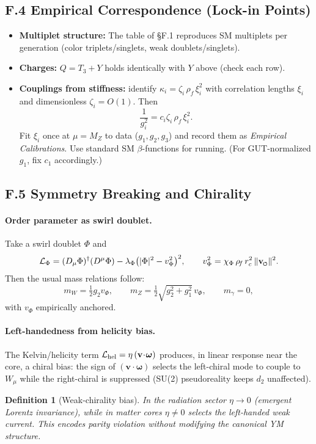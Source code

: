 \documentclass[11pt]{article}
\newcommand{\swirlarrow}{%
     \mathchoice{\mkern-2mu\scriptstyle\boldsymbol{\circlearrowleft}}%
                {\mkern-2mu\scriptstyle\boldsymbol{\circlearrowleft}}%
                {\mkern-2mu\scriptscriptstyle\boldsymbol{\circlearrowleft}}%
                {\mkern-2mu\scriptscriptstyle\boldsymbol{\circlearrowleft}}%
}
\newcommand{\vswirl}{\mathbf{v}_{\swirlarrow}}
\newtheorem{definition}{Definition}[section]
\begin{document}
\subsection*{F.4 Empirical Correspondence (Lock-in Points)}
\begin{itemize}
    \item \textbf{Multiplet structure:} The table of \S F.1 reproduces SM multiplets per generation (color triplets/singlets, weak doublets/singlets).
    \item \textbf{Charges:} $Q=T_3+Y$ holds identically with $Y$ above (check each row).
    \item \textbf{Couplings from stiffness:} identify $\kappa_i=\zeta_i\,\rho_{\!f}\,\xi_i^2$ with correlation lengths $\xi_i$ and dimensionless $\zeta_i=O(1)$. Then
    \[
        \frac{1}{g_i^2}=c_i\zeta_i\,\rho_{\!f}\,\xi_i^2.
    \]
    Fit $\xi_i$ once at $\mu=M_Z$ to data ($g_1,g_2,g_3$) and record them as \emph{Empirical Calibrations}. Use standard SM $\beta$-functions for running\cite{PDG2024}. (For GUT-normalized $g_1$, fix $c_1$ accordingly.)
\end{itemize}

\subsection*{F.5 Symmetry Breaking and Chirality}

\paragraph{Order parameter as swirl doublet.}
Take a swirl doublet $\Phi$ and
\[
    \mathcal L_\Phi=(D_\mu \Phi)^\dagger (D^\mu \Phi)-\lambda_\Phi\big(|\Phi|^2-v_\Phi^2\big)^2,
    \qquad
    v_\Phi^2=\chi_\Phi\,\rho_{\!f}\,r_c^2\,\lVert \vswirl\rVert^2.
\]
Then the usual mass relations follow:
\[
    m_W=\tfrac12 g_2 v_\Phi,\qquad
    m_Z=\tfrac12\sqrt{g_2^2+g_1^2}\,v_\Phi,\qquad
    m_\gamma=0,
\]
with $v_\Phi$ empirically anchored\cite{Weinberg1967,EnglertBrout1964,Higgs1964}.

\paragraph{Left-handedness from helicity bias.}
The Kelvin/helicity term $\mathcal L_{\rm hel}=\eta\,(\mathbf v\!\cdot\!\boldsymbol\omega)$ produces, in linear response near the core, a chiral bias: the sign of $(\mathbf v\!\cdot\!\boldsymbol\omega)$ selects the left-chiral mode to couple to $W_\mu$ while the right-chiral is suppressed (SU(2) pseudoreality keeps $d_2$ unaffected)\cite{Witten1982}.
\begin{definition}[Weak-chirality bias]
In the radiation sector $\eta\!\to\!0$ (emergent Lorentz invariance), while in matter cores $\eta\!\neq\!0$ selects the left-handed weak current. This encodes parity violation without modifying the canonical YM structure.
\end{definition}
\end{document}
